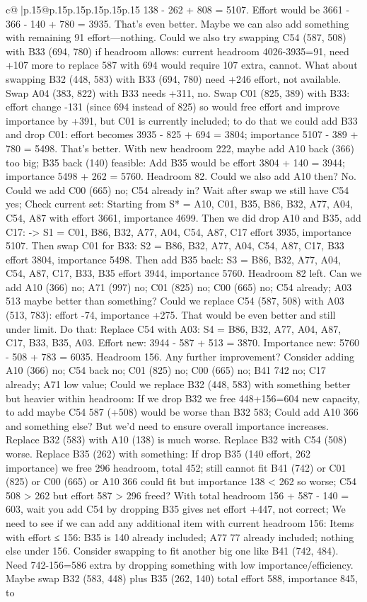 \documentclass{article}
\begin{document}
{\begin{supertabular}{c@{$\;$}|p{.15\linewidth}@{}p{.15\linewidth}p{.15\linewidth}p{.15\linewidth}p{.15\linewidth}p{.15\linewidth}}
{{{138 - 262 + 808 = 5107. Effort would be 3661 - 366 - 140 + 780 = 3935. That’s even better. Maybe we can also add something with remaining 91 effort—nothing. Could we also try swapping C54 (587, 508) with B33 (694, 780) if headroom allows: current headroom 4026-3935=91, need +107 more to replace 587 with 694 would require 107 extra, cannot. What about swapping B32 (448, 583) with B33 (694, 780) need +246 effort, not available. Swap A04 (383, 822) with B33 needs +311, no. Swap C01 (825, 389) with B33: effort change -131 (since 694 instead of 825) so would free effort and improve importance by +391, but C01 is currently included; to do that we could add B33 and drop C01: effort becomes 3935 - 825 + 694 = 3804; importance 5107 - 389 + 780 = 5498. That’s better. With new headroom 222, maybe add A10 back (366) too big; B35 back (140) feasible: Add B35 would be effort 3804 + 140 = 3944; importance 5498 + 262 = 5760. Headroom 82. Could we also add A10 then? No. Could we add C00 (665) no; C54 already in? Wait after swap we still have C54 yes; Check current set: Starting from S* = {A10, C01, B35, B86, B32, A77, A04, C54, A87} with effort 3661, importance 4699. Then we did drop A10 and B35, add C17: -> S1 = {C01, B86, B32, A77, A04, C54, A87, C17} effort 3935, importance 5107. Then swap C01 for B33: S2 = {B86, B32, A77, A04, C54, A87, C17, B33} effort 3804, importance 5498. Then add B35 back: S3 = {B86, B32, A77, A04, C54, A87, C17, B33, B35} effort 3944, importance 5760. Headroom 82 left. Can we add A10 (366) no; A71 (997) no; C01 (825) no; C00 (665) no; C54 already; A03 513 maybe better than something? Could we replace C54 (587, 508) with A03 (513, 783): effort -74, importance +275. That would be even better and still under limit. Do that: Replace C54 with A03: S4 = {B86, B32, A77, A04, A87, C17, B33, B35, A03}. Effort new: 3944 - 587 + 513 = 3870. Importance new: 5760 - 508 + 783 = 6035. Headroom 156. Any further improvement? Consider adding A10 (366) no; C54 back no; C01 (825) no; C00 (665) no; B41 742 no; C17 already; A71 low value; Could we replace B32 (448, 583) with something better but heavier within headroom: If we drop B32 we free 448+156=604 new capacity, to add maybe C54 587 (+508) would be worse than B32 583; Could add A10 366 and something else? But we'd need to ensure overall importance increases. Replace B32 (583) with A10 (138) is much worse. Replace B32 with C54 (508) worse. Replace B35 (262) with something: If drop B35 (140 effort, 262 importance) we free 296 headroom, total 452; still cannot fit B41 (742) or C01 (825) or C00 (665) or A10 366 could fit but importance 138 < 262 so worse; C54 508 > 262 but effort 587 > 296 freed? With total headroom 156 + 587 - 140 = 603, wait you add C54 by dropping B35 gives net effort +447, not correct; We need to see if we can add any additional item with current headroom 156: Items with effort ≤ 156: B35 is 140 already included; A77 77 already included; nothing else under 156. Consider swapping to fit another big one like B41 (742, 484). Need 742-156=586 extra by dropping something with low importance/efficiency. Maybe swap B32 (583, 448) plus B35 (262, 140) total effort 588, importance 845, to }}}
\end{supertabular}}
\end{document}
